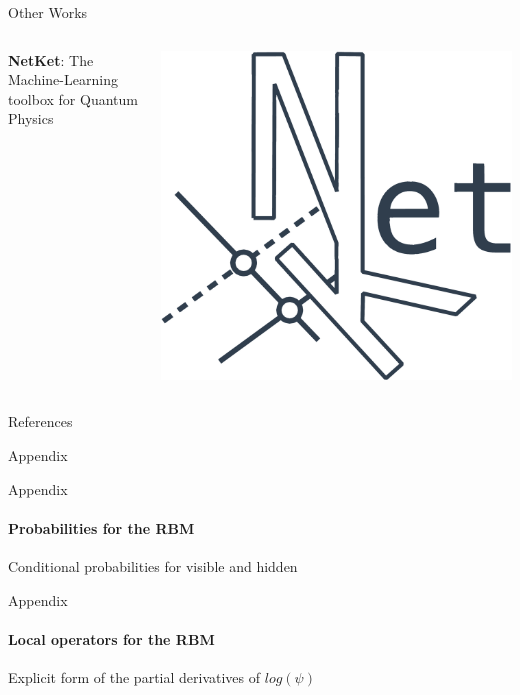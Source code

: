 \documentclass{beamer}
\begin{document}
\begin{frame}{Other Works}
\begin{columns}
\begin{column}{0.6\textwidth}
\textbf{NetKet}: The Machine-Learning toolbox for Quantum Physics
\end{column}
\begin{column}{0.3\textwidth}
\includegraphics[width=\textwidth]{images/netket.png}
\end{column}
\end{columns}
\end{frame}

\begin{frame}{References}

\end{frame}

\backmatter

\appendix


\begin{chapter}{}{Appendix}
\end{chapter}

\begin{frame}{Appendix}
\framesubtitle{Probabilities for the RBM}
Conditional probabilities for visible and hidden
\end{frame}

\begin{frame}{Appendix}
\framesubtitle{Local operators for the RBM}
Explicit form of the partial derivatives of $log\left(\psi\right)$


\end{frame}
\end{document}
